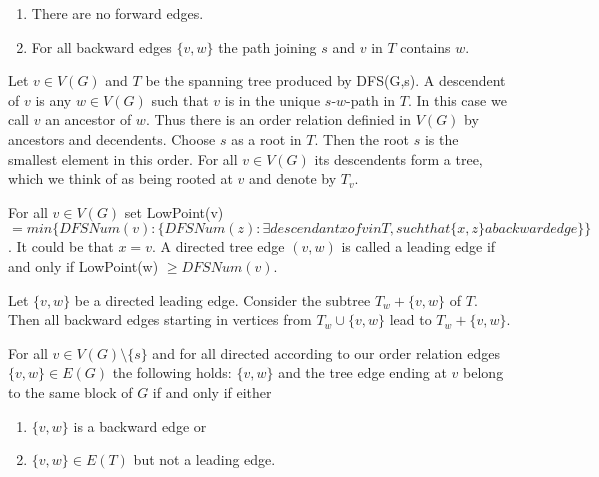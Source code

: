 \documentclass[aagt.tex]{subfiles}
\begin{document}
\begin{lemma}[2.9?]\label{2.9}
  \begin{enumerate}[label=(\alph*)]
    \item There are no forward edges.
    \item For all backward edges $\{v,w\}$ the path joining $s$ and $v$ in $T$ contains $w$.
  \end{enumerate}
\end{lemma}

\begin{defi*}
  Let $v \in V(G)$ and $T$ be the spanning tree produced by DFS(G,s).
  A descendent of $v$ is any $w \in V(G)$ such that $v$ is in the unique $s$-$w$-path in $T$.
  In this case we call $v$ an ancestor of $w$.
  Thus there is an order relation definied in $V(G)$ by ancestors and decendents.
  Choose $s$ as a root in $T$. Then the root $s$ is the smallest element in this order.
  For all $v \in V(G)$ its descendents form a tree, which we think of as being rooted at $v$ and denote by $T_v$.
\end{defi*}

\begin{defi*}
  For all $v \in V(G)$ set LowPoint(v) $= min\{ DFSNum(v): \{ DFSNum(z): \exists descendant x of v in T, such that \{x,z\} a backward edge\}\}$. It could be that $x=v$.
A directed tree edge $(v,w)$ is called a leading edge if and only if LowPoint(w) $\geq DFSNum(v)$.
\end{defi*}

\begin{lemma}
  Let $\{v,w\}$ be a directed leading edge. Consider the subtree $T_w + \{v,w\}$ of $T$.
  Then all backward edges starting in vertices from $T_w \cup \{v,w\}$ lead to $T_w + \{v,w\}$.
\end{lemma}

\begin{theorem}
  For all $v \in V(G) \setminus \{s\}$ and for all directed according to our order relation edges $\{v,w\} \in E(G)$ the following holds:
  $\{v,w\}$ and the tree edge ending at $v$ belong to the same block of $G$ if and only if either
  \begin{enumerate}[label=(\alph*)]
    \item $\{v,w\}$ is a backward edge or
    \item $\{v,w\} \in E(T)$ but not a leading edge.
  \end{enumerate}
\end{theorem}
\end{document}

